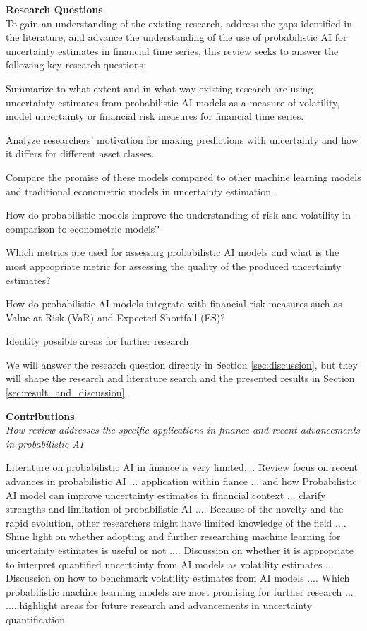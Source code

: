 \textbf{Research Questions}\\
To gain an understanding of the existing research, address the gaps identified in the literature,  and advance the understanding of the use of probabilistic AI for uncertainty estimates in financial time series, this review seeks to answer the following key research questions: 
\begin{enumerate}
    \item Summarize to what extent and in what way existing research are using uncertainty estimates from probabilistic AI models as a measure of volatility, model uncertainty or financial risk measures for financial time series.
    {\color{orange} \item Analyze researchers' motivation for making predictions with uncertainty and how it differs for different asset classes.}
    \item Compare the promise of these models compared to other machine learning models and traditional econometric models in uncertainty estimation.
    \item How do probabilistic models improve the understanding of risk and volatility in comparison to econometric models?
    \item Which metrics are used for assessing probabilistic AI models and what is the most appropriate metric for assessing the quality of the produced uncertainty estimates?
    \item How do probabilistic AI models integrate with financial risk measures such as Value at Risk (VaR) and Expected Shortfall (ES)?
    \item Identity possible areas for further research
\end{enumerate}

We will answer the research question directly in Section \ref{sec:discussion}, but they will shape the research and literature search and the presented results in Section \ref{sec:result_and_discussion}. 

 
\textbf{Contributions}\\
\textit{How review addresses the specific applications in finance and recent advancements in probabilistic AI}

Literature on probabilistic AI in finance is very limited.... Review focus on recent advances in probabilistic AI ... application within fiance ... and how Probabilistic AI model can improve uncertainty estimates in financial context  ... clarify strengths and limitation of probabilistic AI .... Because of the novelty and the rapid evolution, other researchers might have limited knowledge of the field .... Shine light on whether adopting and further researching machine learning for uncertainty estimates is useful or not .... Discussion on whether it is appropriate to interpret quantified uncertainty from AI models as volatility estimates ... Discussion on how to benchmark volatility estimates from AI models .... Which probabilistic machine learning models are most promising for further research ...
.....highlight areas for future research and advancements in uncertainty quantification


